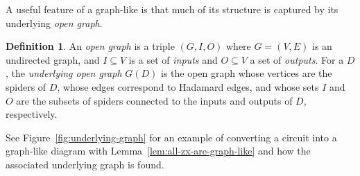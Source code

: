 \documentclass[a4paper,onecolumn,superscriptaddress,11pt,accepted=2020-04-27]{quantumarticle}
\newcommand{\UG}[1]{\ensuremath{G(#1)}\xspace}
\theoremstyle{definition}
\newtheorem{definition}[theorem]{Definition}
\newtheorem{remark}[theorem]{Remark}
\begin{document}




A useful feature of a graph-like \zxdiagram is that much of its structure is captured by its underlying \textit{open graph}.

\begin{definition}\label{def:open-graph}
  An \emph{open graph} is a triple $(G,I,O)$ where $G = (V,E)$ is an undirected graph, and $I \subseteq V$ is a set of \emph{inputs} and $O \subseteq V$ a set of \emph{outputs}. For a \zxdiagram $D$, the \emph{underlying open graph} $\UG D$ is the open graph whose vertices are the spiders of $D$, whose edges correspond to Hadamard edges, and whose sets $I$ and $O$ are the subsets of spiders connected to the inputs and outputs of $D$, respectively.
\end{definition}

See Figure~\ref{fig:underlying-graph} for an example of converting a circuit into a graph-like diagram with Lemma~\ref{lem:all-zx-are-graph-like} and how the associated underlying graph is found.


\end{document}
